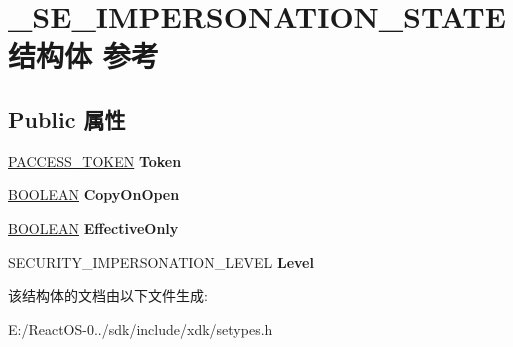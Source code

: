 \hypertarget{struct___s_e___i_m_p_e_r_s_o_n_a_t_i_o_n___s_t_a_t_e}{}\section{\+\_\+\+S\+E\+\_\+\+I\+M\+P\+E\+R\+S\+O\+N\+A\+T\+I\+O\+N\+\_\+\+S\+T\+A\+T\+E结构体 参考}
\label{struct___s_e___i_m_p_e_r_s_o_n_a_t_i_o_n___s_t_a_t_e}
\subsection*{Public 属性}
\begin{DoxyCompactItemize}
\item 
\mbox{\label{struct___s_e___i_m_p_e_r_s_o_n_a_t_i_o_n___s_t_a_t_e_a127cf3dc94e9e39ea81f78d6e9aea21a}} 
\hyperlink{interfacevoid}{P\+A\+C\+C\+E\+S\+S\+\_\+\+T\+O\+K\+EN} {\bfseries Token}
\item 
\mbox{\label{struct___s_e___i_m_p_e_r_s_o_n_a_t_i_o_n___s_t_a_t_e_a5bd66ee523b85557642cb744a7285cb7}} 
\hyperlink{_processor_bind_8h_a112e3146cb38b6ee95e64d85842e380a}{B\+O\+O\+L\+E\+AN} {\bfseries Copy\+On\+Open}
\item 
\mbox{\label{struct___s_e___i_m_p_e_r_s_o_n_a_t_i_o_n___s_t_a_t_e_a1f88b52f4388953deb11e8287a1b0c0d}} 
\hyperlink{_processor_bind_8h_a112e3146cb38b6ee95e64d85842e380a}{B\+O\+O\+L\+E\+AN} {\bfseries Effective\+Only}
\item 
\mbox{\label{struct___s_e___i_m_p_e_r_s_o_n_a_t_i_o_n___s_t_a_t_e_ab7d323a2b71a33905b0b15f44b690b12}} 
S\+E\+C\+U\+R\+I\+T\+Y\+\_\+\+I\+M\+P\+E\+R\+S\+O\+N\+A\+T\+I\+O\+N\+\_\+\+L\+E\+V\+EL {\bfseries Level}
\end{DoxyCompactItemize}


该结构体的文档由以下文件生成\+:\begin{DoxyCompactItemize}
\item 
E\+:/\+React\+O\+S-\/0../sdk/include/xdk/setypes.\+h\end{DoxyCompactItemize}

